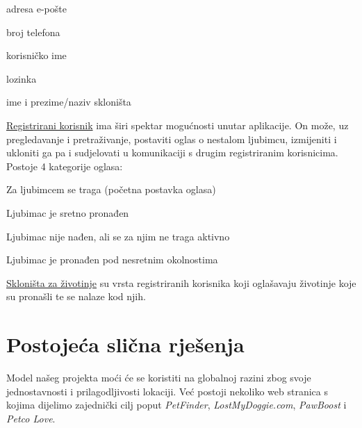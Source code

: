 		\begin{packed_item}
			\item adresa e-pošte
			\item broj telefona
			\item korisničko ime
			\item lozinka
			\item ime i prezime/naziv skloništa
		\end{packed_item}
		
		\underline{Registrirani korisnik} ima širi spektar mogućnosti unutar aplikacije. On može, uz pregledavanje i pretraživanje, postaviti oglas o nestalom ljubimcu, izmijeniti i ukloniti ga pa i sudjelovati u komunikaciji s drugim registriranim korisnicima.\\
		
		Postoje 4 kategorije oglasa:
		
		\begin{packed_item}
			\item Za ljubimcem se traga (početna postavka oglasa)
			\item Ljubimac je sretno pronađen
			\item Ljubimac nije nađen, ali se za njim ne traga aktivno
			\item Ljubimac je pronađen pod nesretnim okolnostima
		\end{packed_item}
		
		\underline{Skloništa za životinje} su vrsta registriranih korisnika koji oglašavaju životinje koje su pronašli te se nalaze kod njih.
		
		\eject
		
		\section{Postojeća slična rješenja}
		
		Model našeg projekta moći će se koristiti na globalnoj razini zbog svoje jednostavnosti i prilagodljivosti lokaciji. Već postoji nekoliko web stranica s kojima dijelimo zajednički cilj poput \textit{PetFinder}, \textit{LostMyDoggie.com}, \textit{PawBoost} i \textit{Petco Love}.
		
